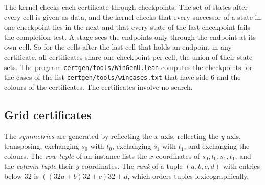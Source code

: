 \documentclass[11pt]{article}
\newcommand{\lean}[1]{\texttt{#1}}
\begin{document}
The kernel checks each certificate through checkpoints. The set of states after every cell is
given as data, and the kernel checks that every successor of a state in one checkpoint lies in the
next and that every state of the last checkpoint fails the completion test. A stage sees the
endpoints only through the endpoint at its own cell. So for the cells after the last cell that
holds an endpoint in any certificate, all certificates share one checkpoint per cell, the union of
their state sets. The program \lean{certgen/tools/WinGenU.lean} computes the checkpoints for the
cases of the list \lean{certgen/tools/wincases.txt} that have side $6$ and the colours of the
certificates. The certificates involve no search.

\subsection{Grid certificates}

The \emph{symmetries} are generated by reflecting the $x$-axis, reflecting the $y$-axis,
transposing, exchanging $s_0$ with $t_0$, exchanging $s_1$ with $t_1$, and exchanging the colours.
The \emph{row tuple} of an instance lists the $x$-coordinates of $s_0,t_0,s_1,t_1$, and the
\emph{column tuple} their $y$-coordinates. The \emph{rank} of a tuple $(a,b,c,d)$ with entries
below $32$ is $((32a+b)32+c)32+d$, which orders tuples lexicographically.
\end{document}
